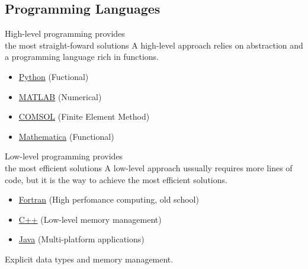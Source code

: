 \documentclass[xcolor={dvipsnames}]{beamer}
\begin{document}
\subsection{Programming Languages}

\begin{frame}{High-level programming provides\\ the most straight-foward solutions}{}
A high-level approach relies on abstraction and a programming language rich in functions.

\bigskip
\begin{itemize}
\item \href{https://www.python.org/}{Python} (Fuctional)
\item \href{https://www.mathworks.com/products/matlab/}{MATLAB} (Numerical)
\item \href{https://www.comsol.com/multiphysics/finite-element-method}{COMSOL} (Finite Element Method)
\item \href{https://www.wolfram.com/mathematica/}{Mathematica} (Functional)
\end{itemize}
\end{frame}

\begin{frame}{Low-level programming provides\\ the most efficient solutions}{}
A low-level approach ussually requires more lines of code, but it is the way to achieve the most efficient solutions.

\bigskip
\begin{itemize}
\item \href{https://gcc.gnu.org/fortran/}{Fortran} (High perfomance computing, old school)
\item \href{http://www.cplusplus.com/doc/tutorial/}{C++} (Low-level memory management)
\item \href{http://www.oracle.com/technetwork/articles/javase/jdk-netbeans-jsp-142931.html}{Java} (Multi-platform applications)
\end{itemize}

\bigskip
Explicit data types and memory management.
\end{frame}
\end{document}
